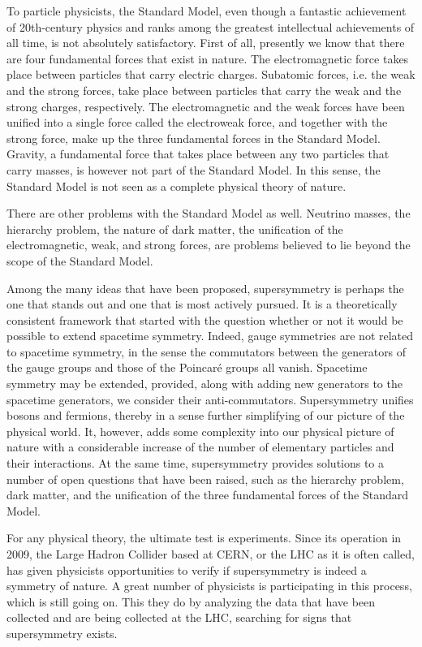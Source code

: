 To particle physicists, the Standard Model, even though a fantastic achievement
of 20th-century physics and ranks among the greatest intellectual achievements
of all time, is not absolutely satisfactory. First of all, presently we know
that there are four fundamental forces that exist in nature. The
electromagnetic force takes place between particles that carry electric
charges. Subatomic forces, i.e. the weak and the strong forces, take place
between particles that carry the weak and the strong charges, respectively. The
electromagnetic and the weak forces have been unified into a single force
called the electroweak force, and together with the strong force, make up the
three fundamental forces in the Standard Model. Gravity, a fundamental force
that takes place between any two particles that carry masses, is however not
part of the Standard Model. In this sense, the Standard Model is not seen as a
complete physical theory of nature.

There are other problems with the Standard Model as well. Neutrino masses, the
hierarchy problem, the nature of dark matter, the unification of the
electromagnetic, weak, and strong forces, are problems believed to lie beyond
the scope of the Standard Model.

Among the many ideas that have been proposed, supersymmetry is perhaps the one
that stands out and one that is most actively pursued. It is a theoretically
consistent framework that started with the question whether or not it would be
possible to extend spacetime symmetry. Indeed, gauge symmetries are not related
to spacetime symmetry, in the sense the commutators between the generators of
the gauge groups and those of the Poincar\'{e} groups all vanish. Spacetime
symmetry may be extended, provided, along with adding new generators to the
spacetime generators, we consider their anti-commutators. Supersymmetry unifies
bosons and fermions, thereby in a sense further simplifying of our picture of
the physical world. It, however, adds some complexity into our physical picture
of nature with a considerable increase of the number of elementary particles
and their interactions. At the same time, supersymmetry provides solutions to a
number of open questions that have been raised, such as the hierarchy problem,
dark matter, and the unification of the three fundamental forces of the
Standard Model.


For any physical theory, the ultimate test is experiments. Since its operation
in 2009, the Large Hadron Collider based at CERN, or the LHC as it is often
called, has given physicists opportunities to verify if supersymmetry is indeed
a symmetry of nature. A great number of physicists is participating in this
process, which is still going on. This they do by analyzing the data that have
been collected and are being collected at the LHC, searching for signs that
supersymmetry exists.

